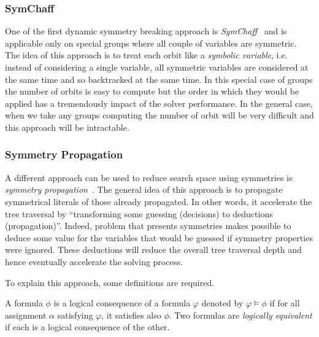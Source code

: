 \subsubsection{SymChaff}

One of the first dynamic symmetry breaking approach is \emph{SymChaff}~\cite{sabharwal2005symchaff}
and is applicable only on special groups where all couple of variables are symmetric.
The idea of this approach is to treat each orbit like a \emph{symbolic variable}, i.e. instead of considering a single
variable, all symmetric variables are considered at the same time and so backtracked at the same time.
In this special case of groups the number of orbits is easy to compute but the order in which they would be
applied has a tremendously impact of the solver performance.
In the general case, when we take any groups computing the number of orbit will be very difficult and this approach
will be intractable.


\subsubsection{Symmetry Propagation}

A different approach can be used to reduce search space using symmetries is \emph{symmetry propagation}~\cite{Devriendt12}.
The general idea of this approach is to propagate symmetrical literals of those already propagated.
In other words, it accelerate the tree traversal by ``transforming some guessing (decisions) to deductions (propagation)''.
Indeed, problem that presents symmetries makes possible to deduce some value 
for the variables that would be guessed if symmetry properties were ignored.
These deductions will reduce the overall tree traversal depth and hence eventually accelerate the solving process.

To explain this approach, some definitions are required.


\begin{definition}
	\label{def:logical_consequence}
	A formula $\phi$ is a logical consequence of a formula $\varphi$ denoted by $\varphi \models \phi$ if for all assignment
	$\alpha$ satisfying $\varphi$, it satisfies also $\phi$. Two formulas are \emph{logically equivalent} if each is a logical
	consequence of the other.
\end{definition}

